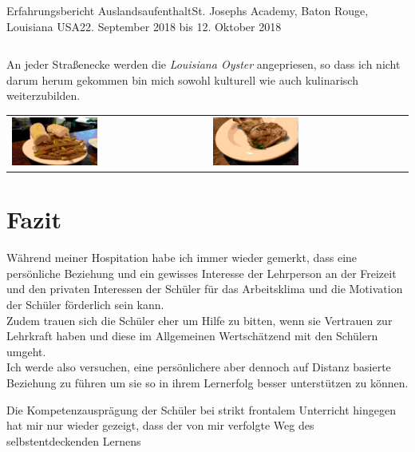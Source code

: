 \documentclass[oneside,openany,headings=optiontotoc,11pt,numbers=noenddot]{article}
\begin{document}
\begin{worksheet}{Erfahrungsbericht Auslandsaufenthalt}{St. Joseph\grq{}s Academy, Baton Rouge, Louisiana USA}{22. September 2018 bis 12. Oktober 2018}
\begin{center}
\begin{tabularx}{\textwidth}{XX}
			\end{tabularx}
		\end{center}
		An jeder Straßenecke werden die \textit{Louisiana Oyster} angepriesen, so dass ich nicht darum herum gekommen bin mich sowohl kulturell wie auch kulinarisch weiterzubilden.\\
		\begin{center}
			\begin{tabularx}{\textwidth}{XX}
				\includegraphics[width=0.45\textwidth]{../99_Bilder/00_food.jpg} & \includegraphics[width=0.45\textwidth]{../99_Bilder/01_food.jpg}
			\end{tabularx}
		\end{center}
		\section{Fazit}
		Während meiner Hospitation habe ich immer wieder gemerkt, dass eine persönliche Beziehung und ein gewisses Interesse der Lehrperson an der Freizeit und den privaten Interessen der Schüler für das Arbeitsklima und die Motivation der Schüler förderlich sein kann.\\
		Zudem trauen sich die Schüler eher um Hilfe zu bitten, wenn sie Vertrauen zur Lehrkraft haben und diese im Allgemeinen Wertschätzend mit den Schülern umgeht.\\
		Ich werde also versuchen, eine persönlichere aber dennoch auf Distanz basierte Beziehung zu führen um sie so in ihrem Lernerfolg besser unterstützen zu können.
		\par\noindent
		Die Kompetenzausprägung der Schüler bei strikt frontalem Unterricht hingegen hat mir nur wieder gezeigt, dass der von mir verfolgte Weg des selbstentdeckenden Lernens 
	\end{worksheet}
\end{document}

